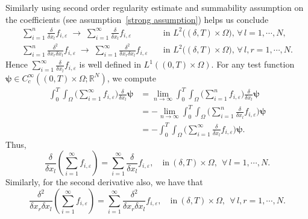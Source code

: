 \documentclass[a4paper,12pt,reqno]{amsart}
\theoremstyle{plain}
\numberwithin{equation}{section}
\begin{document}
	Similarly using second order regularity estimate \cite{quittner2007} and summability assumption on the coefficients (see assumption~\eqref{strong assumption}) helps us conclude 
	\begin{align*}
		\sum_{i=1}^{n} \frac{\delta}{\delta x_l} f_{i,\varepsilon}
		\;\longrightarrow\;
		\sum_{i=1}^{\infty} \frac{\delta}{\delta x_l} f_{i,\varepsilon}
		\quad &\text{in } L^2\!\big((\delta,T)\times\Omega\big), \, \forall\, l=1,\cdots,N,\\
		\sum_{i=1}^{n} \frac{\delta^2}{\delta x_r\delta x_l} f_{i,\varepsilon}
		\;\longrightarrow\;
		\sum_{i=1}^{\infty} \frac{\delta^2}{\delta x_r\delta x_l} f_{i,\varepsilon}
		\quad &\text{in } L^2\!\big((\delta,T)\times\Omega\big), \, \forall\, l,r=1,\cdots,N.
	\end{align*}
	Hence $\sum_{i=1}^{\infty} \frac{\delta}{\delta x_l} f_{i,\varepsilon}$ is well defined in
	$L^1((0,T)\times\Omega)$. For any test function
	$\boldsymbol{\psi}\in C_c^\infty((0,T)\times\Omega;\mathbb{R}^N)$, we compute
	\begin{align*}
		\int_0^T\!\!\int_\Omega
		\Big(\sum_{i=1}^{\infty} f_{i,\varepsilon}\Big)
		\frac{\delta}{\delta x_l}\!\boldsymbol{\psi}
		&=
		\lim_{n\to\infty}
		\int_0^T\!\!\int_\Omega
		\Big(\sum_{i=1}^{n} f_{i,\varepsilon}\Big)
		\frac{\delta}{\delta x_l}\!\boldsymbol{\psi}
		\\
		&=
		-\lim_{n\to\infty}
		\int_0^T\!\!\int_\Omega
		\Big(\sum_{i=1}^{n} \frac{\delta}{\delta x_l} f_{i,\varepsilon}\Big)
		\boldsymbol{\psi}
		\\
		&=
		-\int_0^T\!\!\int_\Omega
		\Big(\sum_{i=1}^{\infty} \frac{\delta}{\delta x_l} f_{i,\varepsilon}\Big)
		\boldsymbol{\psi}.
	\end{align*}
	Thus,
	\[
	\frac{\delta}{\delta x_l}\!\left(\sum_{i=1}^{\infty} f_{i,\varepsilon}\right)
	=
	\sum_{i=1}^{\infty} \frac{\delta}{\delta x_l} f_{i,\varepsilon}, \quad \mbox{in}\ (\delta,T)\times\Omega, \ \  \forall\, l=1,\cdots,N.
	\]
	Similarly, for the second derivative also, we have that
	\[
	\frac{\delta^2}{\delta x_r\delta x_l}\!\left(\sum_{i=1}^{\infty} f_{i,\varepsilon}\right)
	=
	\sum_{i=1}^{\infty} \frac{\delta^2}{\delta x_r\delta x_l} f_{i,\varepsilon}, \quad \mbox{in}\ (\delta,T)\times\Omega, \ \  \forall\, l,r=1,\cdots,N.
	\]
	
	
	
	
	
\end{document}
